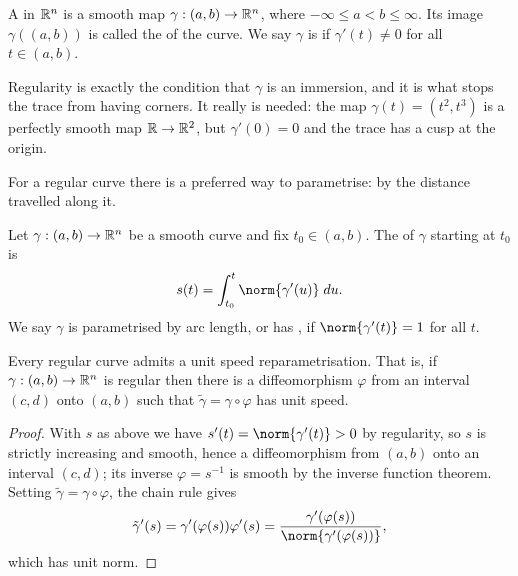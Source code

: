\documentclass[a4paper]{scrartcl}
\begin{document}
\begin{definition}
    A  in $\mathbb{R}^n$ is a smooth map $\gamma: (a, b) \rightarrow \mathbb{R}^n$, where $-\infty \leq a < b \leq \infty$. Its image $\gamma((a,b))$ is called the  of the curve. We say $\gamma$ is  if $\gamma'(t) \neq 0$ for all $t \in (a,b)$.
\end{definition}

Regularity is exactly the condition that $\gamma$ is an immersion, and it is what stops the trace from having corners. It really is needed: the map $\gamma(t) = (t^2, t^3)$ is a perfectly smooth map $\mathbb{R} \rightarrow \mathbb{R}^2$, but $\gamma'(0) = 0$ and the trace has a cusp at the origin.

\begin{center}
\end{center}

For a regular curve there is a preferred way to parametrise: by the distance travelled along it.

\begin{definition}
    Let $\gamma: (a,b) \rightarrow \mathbb{R}^n$ be a smooth curve and fix $t_0 \in (a,b)$. The  of $\gamma$ starting at $t_0$ is
    $$
    s(t) = \int_{t_0}^{t} \norm{\gamma'(u)} \dd u.
    $$
    We say $\gamma$ is parametrised by arc length, or has , if $\norm{\gamma'(t)} = 1$ for all $t$.
\end{definition}

\begin{lemma}
    Every regular curve admits a unit speed reparametrisation. That is, if $\gamma: (a,b) \rightarrow \mathbb{R}^n$ is regular then there is a diffeomorphism $\varphi$ from an interval $(c,d)$ onto $(a,b)$ such that $\tilde \gamma = \gamma \circ \varphi$ has unit speed.
\end{lemma}
\begin{proof}
    With $s$ as above we have $s'(t) = \norm{\gamma'(t)} > 0$ by regularity, so $s$ is strictly increasing and smooth, hence a diffeomorphism from $(a,b)$ onto an interval $(c,d)$; its inverse $\varphi = s^{-1}$ is smooth by the inverse function theorem. Setting $\tilde\gamma = \gamma \circ \varphi$, the chain rule gives
    $$
    \tilde\gamma'(s) = \gamma'(\varphi(s)) \varphi'(s) = \frac{\gamma'(\varphi(s))}{\norm{\gamma'(\varphi(s))}},
    $$
    which has unit norm.
\end{proof}
\end{document}
